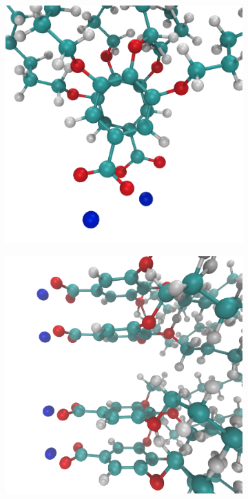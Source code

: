 \documentclass[journal=jpcbfk,manuscript=article]{achemso}
\begin{document}
  \begin{figure}[!htb]
  \centering
  \begin{subfigure}{0.3\linewidth}
  	\centering
  	\includegraphics[width=\textwidth]{rotated_monomers.png}
  	\label{fig:rotated_monomers}
  \end{subfigure}
  \begin{subfigure}{0.3\linewidth}
  	\centering
  	\includegraphics[width=\textwidth]{staggered.png}

\end{subfigure}
\end{figure}
\end{document}
